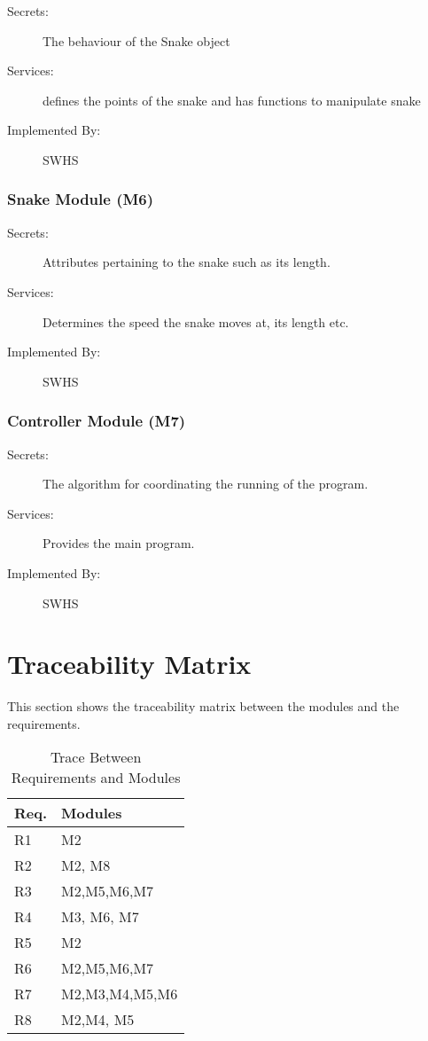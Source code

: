 \documentclass[12pt]{article}
\begin{document}
\begin{description}

\item[Secrets:] The behaviour of the Snake object
\item[Services:] defines the points of the snake and has functions to manipulate snake
\item[Implemented By:] SWHS

\end{description} 
 
\subsubsection{Snake Module (M6)}

\begin{description}
\item[Secrets:] Attributes pertaining to the snake such as its length.
\item[Services:] Determines the speed the snake moves at, its length etc.
\item[Implemented By:] SWHS
\end{description}

\subsubsection{Controller Module (M7)}

\begin{description}
\item[Secrets:] The algorithm for coordinating the running of the program.
\item[Services:] Provides the main program.
\item[Implemented By:] SWHS
\end{description}

\section{Traceability Matrix} \label{SecTM}

This section shows the traceability matrix between the modules and the
requirements.

\begin{table}[H]
\centering
\begin{tabular}{p{} p{}}
\toprule
\textbf{Req.} & \textbf{Modules}\\
\midrule
R1 & M2\\
R2 & M2, M8\\
R3 & M2,M5,M6,M7\\
R4 & M3, M6, M7\\
R5 & M2\\
R6 & M2,M5,M6,M7\\
R7 & M2,M3,M4,M5,M6\\
R8 & M2,M4, M5\\
\bottomrule
\end{tabular}
\caption{Trace Between Requirements and Modules}
\label{TblRT}
\end{table}
\end{document}
